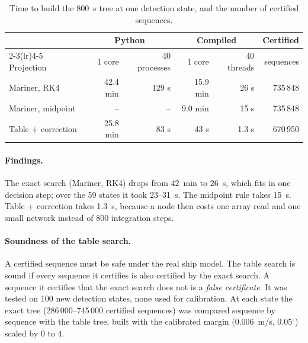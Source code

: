 \documentclass[11pt,a4paper]{article}
\begin{document}
\begin{table}[htbp]
\centering
\caption{Time to build the 800~s tree at one detection state, and the number
of certified sequences.}
\label{tab:compiled}
\small
\begin{tabular}{@{}lrrrrr@{}}
\toprule
 & \multicolumn{2}{c}{Python} & \multicolumn{2}{c}{Compiled} & Certified \\
\cmidrule(lr){2-3}\cmidrule(lr){4-5}
Projection & 1 core & 40 processes & 1 core & 40 threads & sequences \\
\midrule
Mariner, RK4       & 42.4 min & 129 s & 15.9 min & 26 s  & 735\,848 \\
Mariner, midpoint  & --       & --    & 9.0 min  & 15 s  & 735\,848 \\
Table + correction & 25.8 min & 83 s  & 43 s     & 1.3 s & 670\,950 \\
\bottomrule
\end{tabular}
\end{table}

\paragraph{Findings.} The exact search (Mariner, RK4) drops from 42~min to
26~s, which fits in one decision step; over the 59 states it took 23--31~s.
The midpoint rule takes 15~s. Table + correction takes 1.3~s, because a node then costs one array read and one small network instead of 800 integration steps.

\paragraph{Soundness of the table search.} A certified sequence must be safe
under the real ship model. The table search is sound if every sequence it
certifies is also certified by the exact search. A sequence it certifies that
the exact search does not is a \emph{false certificate}. It was tested on
100 new detection states, none used for
calibration. At each state the exact tree (286\,000--745\,000 certified
sequences) was compared sequence by sequence with the table tree, built with
the calibrated margin (0.006~m/s, $0.05^\circ$) scaled by 0 to 4.
\end{document}
